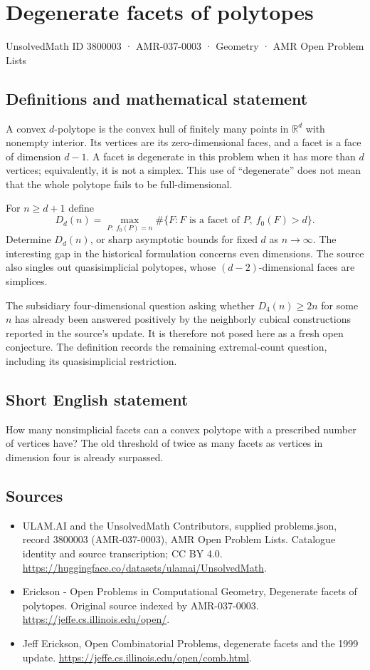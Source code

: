 \documentclass[11pt,a4paper]{article}
\begin{document}
\section*{Degenerate facets of polytopes}\label{3800003}
{\small UnsolvedMath ID 3800003 · AMR-037-0003 · Geometry · AMR Open Problem Lists}
\subsection{Definitions and mathematical statement}
A convex $d$-polytope is the convex hull of finitely many points in
$\mathbb R^d$ with nonempty interior. Its vertices are its zero-dimensional
faces, and a facet is a face of dimension $d-1$. A facet is degenerate in
this problem when it has more than $d$ vertices; equivalently, it is not a
simplex. This use of ``degenerate'' does not mean that the whole polytope
fails to be full-dimensional.

For $n\ge d+1$ define
\[
 D_d(n)=\max_{P:\ f_0(P)=n}
 \#\{F:F\text{ is a facet of }P,\ f_0(F)>d\}.
\]
Determine $D_d(n)$, or sharp asymptotic bounds for fixed $d$ as $n\to\infty$.
The interesting gap in the historical formulation concerns even dimensions.
The source also singles out quasisimplicial polytopes, whose
$(d-2)$-dimensional faces are simplices.

The subsidiary four-dimensional question asking whether $D_4(n)\ge2n$ for
some $n$ has already been answered positively by the neighborly cubical
constructions reported in the source's update. It is therefore not posed
here as a fresh open conjecture. The definition records the remaining
extremal-count question, including its quasisimplicial restriction.
\subsection{Short English statement}
How many nonsimplicial facets can a convex polytope with a prescribed
number of vertices have? The old threshold of twice as many facets as
vertices in dimension four is already surpassed.
\subsection{Sources}
\begin{itemize}
\item[S1] ULAM.AI and the UnsolvedMath Contributors, supplied problems.json, record 3800003 (AMR-037-0003), AMR Open Problem Lists. Catalogue identity and source transcription; CC BY 4.0.
\url{https://huggingface.co/datasets/ulamai/UnsolvedMath}.
\item[S2] Erickson - Open Problems in Computational Geometry, Degenerate facets of polytopes. Original source indexed by AMR-037-0003.
\url{https://jeffe.cs.illinois.edu/open/}.
\item[S3] Jeff Erickson, Open Combinatorial Problems, degenerate facets and the 1999 update.
\url{https://jeffe.cs.illinois.edu/open/comb.html}.
\end{itemize}
\end{document}
